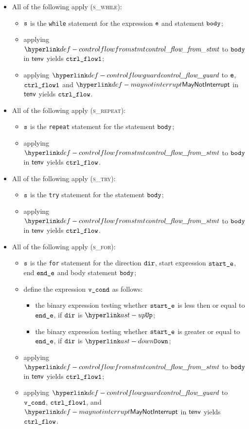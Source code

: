 \begin{itemize}
  \item All of the following apply (\textsc{s\_while}):
  \begin{itemize}
    \item $\texttt{s}$ is the \texttt{while} statement for the expression $\texttt{e}$ and statement $\texttt{body}$;
    \item applying $\controlflowfromstmt$ to $\texttt{body}$ in $\textsf{tenv}$ yields $\texttt{ctrl\_flow1}$;
    \item applying $\controlflowguard$ to $\texttt{e}$, $\texttt{ctrl\_flow1}$ and $\maynotinterrupt$ in $\textsf{tenv}$ yields $\texttt{ctrl\_flow}$.
  \end{itemize}

  \item All of the following apply (\textsc{s\_repeat}):
  \begin{itemize}
    \item $\texttt{s}$ is the \texttt{repeat} statement for the statement $\texttt{body}$;
    \item applying $\controlflowfromstmt$ to $\texttt{body}$ in $\textsf{tenv}$ yields $\texttt{ctrl\_flow}$.
  \end{itemize}

  \item All of the following apply (\textsc{s\_try}):
  \begin{itemize}
    \item $\texttt{s}$ is the \texttt{try} statement for the statement $\texttt{body}$;
    \item applying $\controlflowfromstmt$ to $\texttt{body}$ in $\textsf{tenv}$ yields $\texttt{ctrl\_flow}$.
  \end{itemize}

  \item All of the following apply (\textsc{s\_for}):
  \begin{itemize}
    \item $\texttt{s}$ is the \texttt{for} statement for the direction $\texttt{dir}$, start expression $\texttt{start\_e}$,
          end $\texttt{end\_e}$ and body statement $\texttt{body}$;
    \item define the expression $\texttt{v\_cond}$ as follows:
    \begin{itemize}
      \item the binary expression testing whether $\texttt{start\_e}$ is less then or equal to $\texttt{end\_e}$, if $\texttt{dir}$ is $\UP$;
      \item the binary expression testing whether $\texttt{start\_e}$ is greater or equal to $\texttt{end\_e}$, if $\texttt{dir}$ is $\DOWN$;
    \end{itemize}
    \item applying $\controlflowfromstmt$ to $\texttt{body}$ in $\textsf{tenv}$ yields $\texttt{ctrl\_flow1}$;
    \item applying $\controlflowguard$ to $\texttt{v\_cond}$, $\texttt{ctrl\_flow1}$, and $\maynotinterrupt$ in $\textsf{tenv}$ yields $\texttt{ctrl\_flow}$.
  \end{itemize}
\end{itemize}

